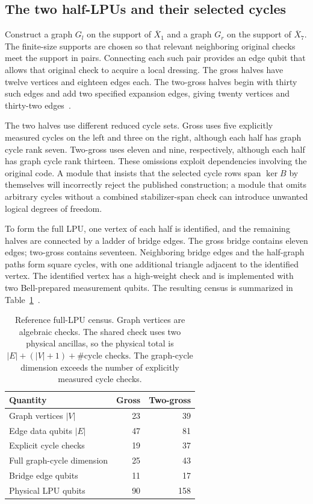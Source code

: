 \documentclass[11pt,a4paper]{article}
\newcommand{\lx}{\overline{X}}
\begin{document}
\subsection{The two half-LPUs and their selected cycles}

Construct a graph $G_l$ on the support of $\lx_1$ and a graph $G_r$ on the support of $\lx_7$. The finite-size supports are chosen so that relevant neighboring original checks meet the support in pairs. Connecting each such pair provides an edge qubit that allows that original check to acquire a local dressing. The gross halves have twelve vertices and eighteen edges each. The two-gross halves begin with thirty such edges and add two specified expansion edges, giving twenty vertices and thirty-two edges~\cite{tdg}.

The two halves use different reduced cycle sets. Gross uses five explicitly measured cycles on the left and three on the right, although each half has graph cycle rank seven. Two-gross uses eleven and nine, respectively, although each half has graph cycle rank thirteen. These omissions exploit dependencies involving the original code. A module that insists that the selected cycle rows span $\ker B$ by themselves will incorrectly reject the published construction; a module that omits arbitrary cycles without a combined stabilizer-span check can introduce unwanted logical degrees of freedom.

To form the full LPU, one vertex of each half is identified, and the remaining halves are connected by a ladder of bridge edges. The gross bridge contains eleven edges; two-gross contains seventeen. Neighboring bridge edges and the half-graph paths form square cycles, with one additional triangle adjacent to the identified vertex. The identified vertex has a high-weight check and is implemented with two Bell-prepared measurement qubits. The resulting census is summarized in Table~\ref{tab:lpu}~\cite{tdg}.

\begin{table}[tb]
\centering
\caption{Reference full-LPU census. Graph vertices are algebraic checks. The shared check uses two physical ancillas, so the physical total is $|E|+(|V|+1)+\#\text{cycle checks}$. The graph-cycle dimension exceeds the number of explicitly measured cycle checks.}
\label{tab:lpu}
\begin{tabular}{lrr}
\toprule
Quantity & Gross & Two-gross\\\midrule
Graph vertices $|V|$ & 23 & 39\\
Edge data qubits $|E|$ & 47 & 81\\
Explicit cycle checks & 19 & 37\\
Full graph-cycle dimension & 25 & 43\\
Bridge edge qubits & 11 & 17\\
Physical LPU qubits & 90 & 158\\\bottomrule
\end{tabular}
\end{table}
\end{document}
